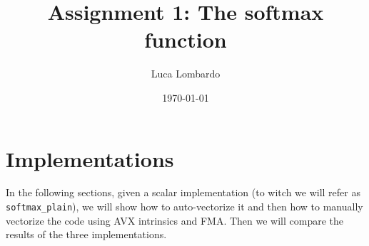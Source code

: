 \documentclass[10pt]{article}
\title{Assignment 1: The softmax function}
\author{Luca Lombardo}
\date{\today}
\newcommand{\R}{\mathbb{R}}
\begin{document}
\maketitle


\setlength{\parindent}{0em}



\section{Implementations}
In the following sections, given a scalar implementation (to witch we will refer as \texttt{softmax\_plain}), we will show how to auto-vectorize it and then how to manually vectorize the code using AVX intrinsics and FMA. Then we will compare the results of the three implementations.
\end{document}
